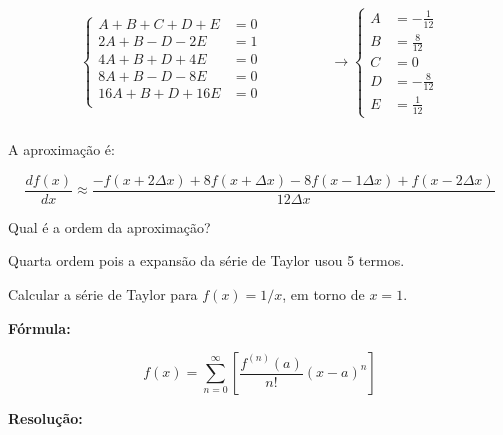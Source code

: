 \documentclass[11pt]{homework}
\begin{document}
\begin{alphaparts}
        \begin{align*}
            \begin{cases}
            A+B+C+D+E &= 0\\
            2A+B-D-2E &= 1\\
            4A+B+D+4E &= 0\\
            8A+B-D-8E &= 0\\
            16A+B+D+16E &= 0\\
            \end{cases}
            & \qquad \qquad\to 
            \begin{cases}
            A &= -\frac{1}{12}\\
            B &= \frac{8}{12}\\
            C &= 0\\
            D &= -\frac{8}{12}\\
            E &= \frac{1}{12}
            \end{cases}\\
        \end{align*}
        
        A aproximação é:
        
        \begin{equation*}
            \frac{df(x)}{dx} \approx \frac{-f(x+2\Delta x) + 8f(x+\Delta x) - 8f(x-1\Delta x) + f(x-2\Delta x)}{12\Delta x}
        \end{equation*}

        
        \questionpart Qual é a ordem da aproximação?
        
        Quarta ordem pois a expansão da série de Taylor usou 5 termos.

    \end{alphaparts}
    
    \question Calcular a série de Taylor para $f(x)=1/x$, em torno de $x=1$.
    
    \textbf{Fórmula:}
    
    \begin{equation}
        f(x) = \sum_{n=0}^\infty \left[ \frac{f^{(n)}(a)}{n!}(x-a)^n \right]
    \end{equation}
    
    \textbf{Resolução:}
    
\end{document}
